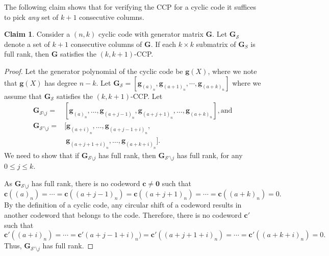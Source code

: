 \documentclass[journal,twocolumn]{IEEEtran}
\theoremstyle{definition}
\newtheorem{claim}{Claim}
\newcommand{\calS}{\mathcal{S}}
\newcommand{\bfg}{\mathbf{g}}
\newcommand{\bfc}{\mathbf{c}}
\newcommand{\bfG}{\mathbf{G}}
\newcommand{\aditya}[1]{\marginpar{+}{\bf Aditya's remark}: {\em #1}}
\begin{document}
The following claim shows that for verifying the CCP for a cyclic code it suffices to pick {\it any} set of $k+1$ consecutive columns.
\begin{claim}
	\label{claim:cyclic_k1}
	Consider a $(n,k)$ cyclic code with generator matrix $\bfG$. Let $\bfG_\calS$ denote a set of $k+1$ consecutive columns of $\bfG$. If each $k \times k$ submatrix of $\bfG_S$ is full rank, then $\bfG$ satisfies the $(k,k+1)$-CCP.
\end{claim}
\begin{proof}

Let the generator polynomial of the cyclic code be $\bfg(X)$, where we note that $\bfg(X)$ has degree $n-k$. Let $\bfG_{\calS}=[\bfg_{(a)_n},\bfg_{(a+1)_n},\cdots,\bfg_{(a+k)_n}]$ where we assume that $\bfG_{\calS}$ satisfies the $(k,k+1)$-CCP. %
Let
\begin{align*}
\bfG_{\calS\setminus j} =& [\bfg_{(a)_n},\dots,\bfg_{(a+j-1)_n},\bfg_{(a+j+1)_n},\dots,\bfg_{(a+k)_n}], \text{and}\\
\bfG_{\calS'\setminus j} =&[\bfg_{(a+i)_n},\dots,\bfg_{(a+j-1+i)_n},\\&~\bfg_{(a+j+1+i)_n},
\dots,\bfg_{(a+k+i)_n}].
\end{align*}
We need to show that if $\bfG_{\calS\setminus j}$ has full rank, then $\bfG_{\calS'\setminus j}$ has full rank, for any $0\le j\le k$. %

As $\bfG_{\calS\setminus j}$ has full rank, there is no codeword $\bfc \neq \mathbf{0}$ such that $\bfc((a)_n)=\cdots=\bfc((a+j-1)_n)=\bfc((a+j+1)_n)=\cdots=\bfc((a+k)_n)=0.$
By the definition of a cyclic code, any circular shift of a codeword results in another codeword that belongs to the code. Therefore, there is no codeword $\bfc'$ such that $\bfc'((a+i)_n)=\cdots=\bfc'(a+j-1+i)_n)=\bfc'((a+j+1+i)_n)=\cdots=\bfc'((a+k+i)_n)=0.$ Thus, $\bfG_{\calS'\setminus j}$ has full rank.
\end{proof}
\end{document}
